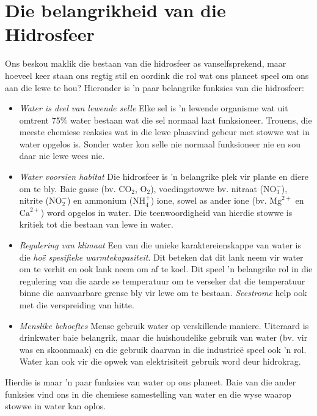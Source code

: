 \section{Die belangrikheid van die Hidrosfeer}
            \nopagebreak

      \label{m38138*id335077}Ons beskou maklik die bestaan van die hidrosfeer as vanselfsprekend, maar hoeveel keer staan ons regtig stil en oordink die rol wat ons planeet speel om ons aan die lewe te hou? Hieronder is  'n paar belangrike funksies van die hidrosfeer:
      \label{m38138*id335082}\begin{itemize}[noitemsep]
            \label{m38138*uid15}\item \textsl{Water is deel van lewende selle}
Elke sel is  'n lewende organisme wat uit omtrent 75\% water bestaan wat die sel normaal laat funksioneer. Trouens, die meeste chemiese reaksies wat in die lewe plaasvind gebeur met stowwe wat in water opgelos is. Sonder water kon selle nie normaal funksioneer nie en sou daar nie lewe wees nie.
\label{m38138*uid16}\item \textsl{Water voorsien habitat}
Die hidrosfeer is  'n belangrike plek vir plante en diere om te bly. Baie gasse (bv. ${\text{CO}}_{2}$, ${\text{O}}_{2}$), voedingstowwe bv. nitraat ($\text{NO}_{3}^{-}$), nitrite ($\text{NO}_{2}^{-}$) en ammonium ($\text{NH}_{4}^{+}$) ione, sowel as ander ione (bv. ${\text{Mg}}^{2+}$ en ${\text{Ca}}^{2+}$) word opgelos in water. Die teenwoordigheid van hierdie stowwe is kritiek tot die bestaan van lewe in water.
\label{m38138*uid17}\item \textsl{Regulering van klimaat}
Een van die unieke karaktereienskappe van water is die \textsl{ho\"{e} spesifieke warmtekapasiteit}. Dit beteken dat dit lank neem vir water om te verhit en ook lank neem om af te koel. Dit speel  'n belangrike rol in die regulering van die aarde se temperatuur om te verseker dat die temperatuur binne die aanvaarbare grense bly vir lewe om te bestaan. \textsl{Seestrome} help ook met die verspreiding van hitte.
\label{m38138*uid18}\item \textsl{Menslike behoeftes}
Mense gebruik water op verskillende maniere. Uiteraard is drinkwater baie belangrik, maar die huishoudelike gebruik van water (bv. vir was en skoonmaak) en die gebruik daarvan in die industrie\"{e} speel ook  'n rol. Water kan ook vir die opwek van elektrisiteit gebruik word deur hidrokrag.
\end{itemize}
Hierdie is maar  'n paar funksies van water op ons planeet. Baie van die ander funksies vind ons in die chemiese samestelling van water en die wyse waarop stowwe in water kan oplos.


